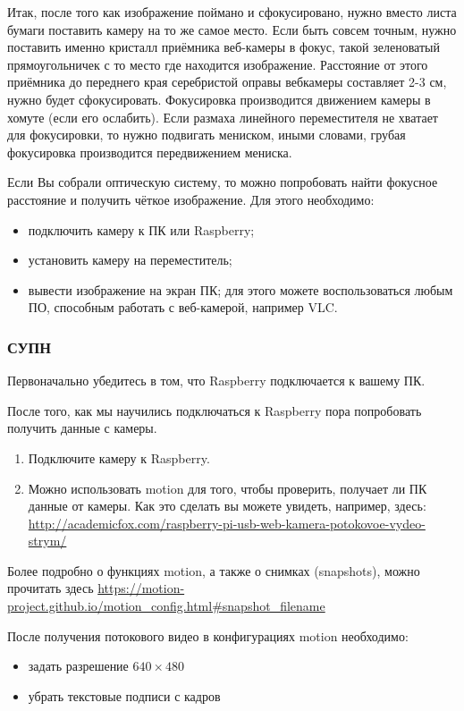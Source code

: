 Итак, после того как изображение поймано и сфокусировано, нужно вместо листа бумаги поставить камеру на то же самое место. Если быть совсем точным, нужно поставить именно кристалл приёмника веб-камеры в фокус, такой зеленоватый прямоугольничек с то место где находится изображение. Расстояние от этого приёмника до переднего края серебристой оправы вебкамеры составляет 2-3 см, нужно будет сфокусировать. Фокусировка производится движением камеры в хомуте (если его ослабить). Если размаха линейного переместителя не хватает для фокусировки, то нужно подвигать мениском, иными словами, грубая фокусировка производится передвижением мениска.

Если Вы собрали оптическую систему, то можно попробовать найти фокусное расстояние и получить чёткое изображение. Для этого необходимо:
\begin{itemize}
    \item подключить камеру к ПК или Raspberry;
    \item установить камеру на переместитель;
    \item вывести изображение на экран ПК; для этого можете воспользоваться любым ПО, способным работать с веб-камерой, например VLC.
\end{itemize}

\subsubsection*{СУПН}

Первоначально убедитесь в том, что Raspberry подключается к вашему ПК. 

После того, как мы научились подключаться к Raspberry пора попробовать получить данные с камеры. 
\begin{enumerate}
    \item Подключите камеру к Raspberry.
    \item Можно использовать motion для того, чтобы проверить, получает ли ПК данные от камеры. Как это сделать вы можете увидеть, например, здесь: \url{http://academicfox.com/raspberry-pi-usb-web-kamera-potokovoe-vydeo-strym/}
\end{enumerate}

Более подробно о функциях motion, а также о снимках (snapshots), можно прочитать здесь \url{https://motion-project.github.io/motion_config.html#snapshot_filename}

После получения потокового видео в конфигурациях motion необходимо:
\begin{itemize}
    \item задать разрешение $640 \times 480$
    \item убрать текстовые подписи с кадров
\end{itemize}

